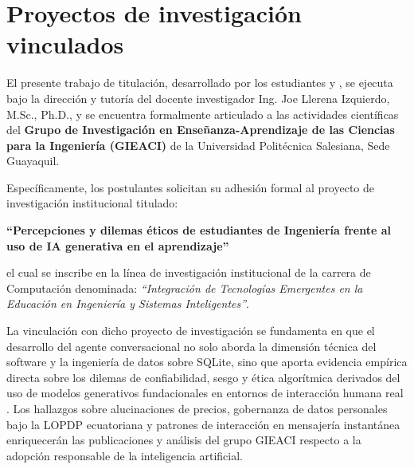 \section{Proyectos de investigación vinculados}

El presente trabajo de titulación, desarrollado por los estudiantes \textbf{\autorUnoProyecto} y \textbf{\autorDosProyecto}, se ejecuta bajo la dirección y tutoría del docente investigador Ing. Joe Llerena Izquierdo, M.Sc., Ph.D., y se encuentra formalmente articulado a las actividades científicas del \textbf{Grupo de Investigación en Enseñanza-Aprendizaje de las Ciencias para la Ingeniería (GIEACI)} de la Universidad Politécnica Salesiana, Sede Guayaquil.

Específicamente, los postulantes solicitan su adhesión formal al proyecto de investigación institucional titulado:
\begin{center}
    \textbf{\enquote{Percepciones y dilemas éticos de estudiantes de Ingeniería frente al uso de IA generativa en el aprendizaje}}
\end{center}
el cual se inscribe en la línea de investigación institucional de la carrera de Computación denominada: \textit{\enquote{Integración de Tecnologías Emergentes en la Educación en Ingeniería y Sistemas Inteligentes}}.

La vinculación con dicho proyecto de investigación se fundamenta en que el desarrollo del agente conversacional no solo aborda la dimensión técnica del software y la ingeniería de datos sobre SQLite, sino que aporta evidencia empírica directa sobre los dilemas de confiabilidad, sesgo y ética algorítmica derivados del uso de modelos generativos fundacionales en entornos de interacción humana real \parencite{educsci14121330,Ayala-Carabajo2026}. Los hallazgos sobre alucinaciones de precios, gobernanza de datos personales bajo la LOPDP ecuatoriana y patrones de interacción en mensajería instantánea enriquecerán las publicaciones y análisis del grupo GIEACI respecto a la adopción responsable de la inteligencia artificial.
